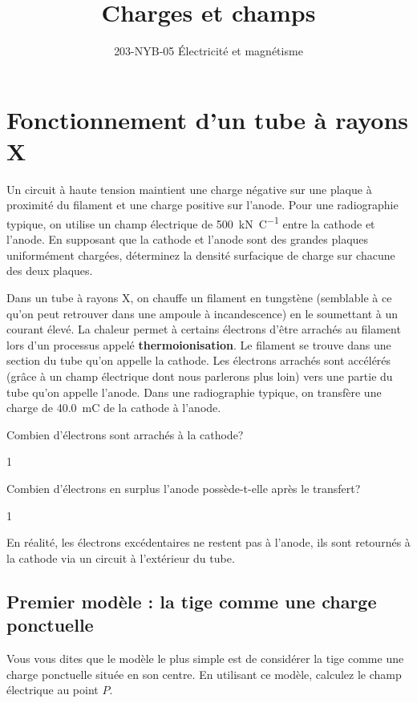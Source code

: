 \documentclass{tufte-handout}
\title{Charges et champs}
\date{}
\author{203-NYB-05 Électricité et magnétisme}
\def\reponse{1}
\begin{document}
\maketitle


\section{Fonctionnement d'un tube à rayons X}

Un circuit à haute tension maintient une charge négative sur une plaque à
proximité du filament et une charge positive sur l'anode. Pour une radiographie
typique, on utilise un champ électrique de \SI{500}{\kilo\newton\per\coulomb}
entre la cathode et l'anode. En supposant que la cathode et l'anode sont des
grandes plaques uniformément chargées, déterminez la densité surfacique de
charge sur chacune des deux plaques.

Dans un tube à rayons X, on chauffe un filament en tungstène (semblable à ce
qu'on peut retrouver dans une ampoule à incandescence) en le soumettant à un
courant élevé. La chaleur permet à certains électrons d'être arrachés au
filament lors d'un processus appelé \textbf{thermoionisation}. Le filament se
trouve dans une section du tube qu'on appelle la cathode. Les électrons
arrachés sont accélérés (grâce à un champ électrique dont nous parlerons plus
loin) vers une partie du tube qu'on appelle l'anode. Dans une radiographie
typique, on transfère une charge de \SI{40.0}{\milli\coulomb} de la cathode à
l'anode.

Combien d'électrons sont arrachés à la cathode?

\if\reponse1
  {\color{tblue}
  }
\else
  \vspace{5cm}
\fi


Combien d'électrons en surplus l'anode possède-t-elle après le transfert?

\if\reponse1
  {\color{tblue}
  }
\else
  \vspace{5cm}
\fi

En réalité, les électrons excédentaires ne restent pas à l'anode, ils sont
retournés à la cathode via un circuit à l'extérieur du tube.


\subsection{Premier modèle : la tige comme une charge ponctuelle}

Vous vous dites que le modèle le plus simple est de considérer la tige comme
une charge ponctuelle située en son centre. En utilisant ce modèle, calculez le
champ électrique au point $P$.
\begin{marginfigure}
\end{marginfigure}
\end{document}
